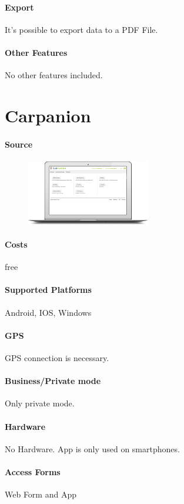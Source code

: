 \paragraph{Export} It’s possible to export data to a PDF File.
\paragraph{Other Features} No other features included.
\newpage

\section{Carpanion}
\paragraph{Source} 
\begin{figure}
  \begin{center}
    \includegraphics[width=0.48\textwidth]{Carpanion1}
  \end{center}
\end{figure}
\paragraph{Costs} free
\paragraph{Supported Platforms} Android, IOS, Windows
\paragraph{GPS} GPS connection is necessary.
\paragraph{Business/Private mode} Only private mode.
\paragraph{Hardware} No Hardware. App is only used on smartphones.
\paragraph{Access Forms}Web Form and App
